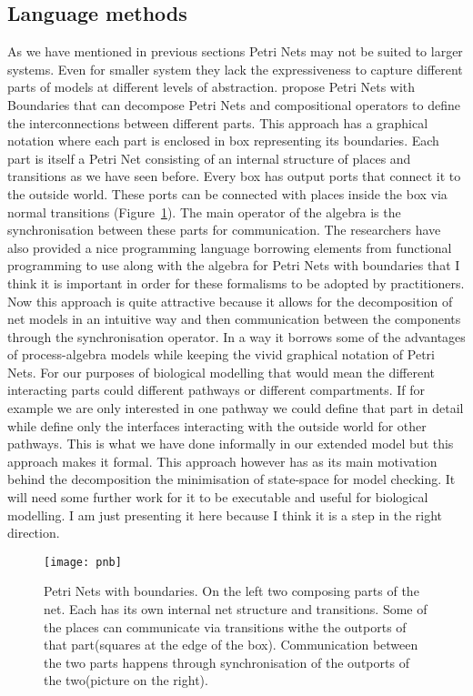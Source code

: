 \subsection{Language methods}
As we have mentioned in previous sections Petri Nets may not be suited
to larger systems. Even for smaller system they lack the
expressiveness to capture different parts of models at different
levels of abstraction. \citet{lprogramming} propose Petri Nets with
Boundaries that can decompose Petri Nets and compositional operators
to define the interconnections between different parts. This approach
has a graphical notation where each part is enclosed in box
representing its boundaries. Each part is itself a Petri Net
consisting of an internal structure of places and transitions as we
have seen before. Every box has output ports that connect it to the
outside world. These ports can be connected with places inside the box
via normal transitions (Figure~\ref{fig:pnb}). The main operator of the algebra is the
synchronisation between these parts for communication. The researchers
have also provided a nice programming language borrowing elements from
functional programming to use along with the
algebra for Petri Nets with boundaries that I think it is important
in order for these formalisms to be adopted by practitioners. Now this
approach is quite attractive because it allows for the decomposition
of net models in an intuitive way and then communication between the
components through the synchronisation operator. In a way it borrows
some of the advantages of process-algebra models while keeping the
vivid graphical notation of Petri Nets. For our purposes of biological
modelling that would mean the different interacting parts could
different pathways or different compartments. If for example we are
only interested in one pathway we could define that part in detail
while define only the interfaces interacting with the outside world
for other pathways. This is what we have done informally in our
extended model but this approach makes it formal. This approach
however has as its main motivation behind the decomposition the
minimisation of state-space for model checking. It will need some
further work for it to be executable and useful for biological
modelling. I am just presenting it here because I think it is a step
in the right direction.

\begin{figure}[htbp!]
\centering
\texttt{[image: pnb]}
\caption[Petri Nets with boundaries]{Petri Nets with boundaries. On
  the left two composing parts of the net. Each has its own internal
  net structure and transitions. Some of the places can communicate
  via transitions withe the outports of that part(squares at the edge
  of the box). Communication between the two parts happens through
  synchronisation of the outports of the two(picture on the right).}
\label{fig:pnb}
\end{figure}

